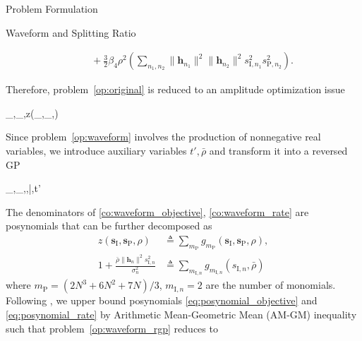 \documentclass[journal]{IEEEtran}
\begin{document}
\begin{section}{Problem Formulation}
\begin{subsection}{Waveform and Splitting Ratio}
\begin{figure*}[!b]
\begin{align}
					& \quad + \frac{3}{2}{\beta_4}{\rho^2} \left( \sum_{n_1,n_2} \lVert{\boldsymbol{h}_{n_1}}\rVert^2 \lVert{\boldsymbol{h}_{n_2}}\rVert^2 s_{\mathrm{I},{n_1}}^2 s_{\mathrm{P},{n_2}}^2 \right).\label{eq:z_waveform}
				\end{align}
			\end{figure*}%
			Therefore, problem~\eqref{op:original} is reduced to an amplitude optimization issue
			\begin{maxi!}
				{_{},_,\rho}{z(_{},_,\rho)}{\label{op:waveform}}{}
			\end{maxi!}
			Since problem~\eqref{op:waveform} involves the production of nonnegative real variables, we introduce auxiliary variables $t',\bar{\rho}$ and transform it into a reversed GP
			\begin{mini!}
				{_{},_,\rho,\bar{\rho},t'}{}{\label{op:waveform_rgp}}{}
				\label{co:waveform_power}
				\label{co:waveform_objective}
				\label{co:waveform_rate}
			\end{mini!}
			The denominators of \eqref{co:waveform_objective}, \eqref{co:waveform_rate} are posynomials \cite{Boyd2007} that can be further decomposed as
			\begin{align}
				z(\boldsymbol{s}_{\mathrm{I}},\boldsymbol{s}_\mathrm{P},\rho) &\triangleq \sum_{m_\mathrm{P}}{g_{m_\mathrm{P}}(\boldsymbol{s}_{\mathrm{I}},\boldsymbol{s}_\mathrm{P},\rho)}\label{eq:posynomial_objective},\\
				1+\frac{\bar{\rho}\lVert{\boldsymbol{h}_n}\rVert^2 s_{\mathrm{I},n}^2}{\sigma_n^2} &\triangleq \sum_{m_{\mathrm{I},n}}g_{m_{\mathrm{I},n}}(s_{\mathrm{I},n},\bar{\rho})\label{eq:posynomial_rate}
			\end{align}
			where $m_\mathrm{P}=(2N^3+6N^2+7N)/3$, $m_{\mathrm{I},n}=2$ are the number of monomials. Following \cite{Chiang2005}, we upper bound posynomials \eqref{eq:posynomial_objective} and \eqref{eq:posynomial_rate} by Arithmetic Mean-Geometric Mean (AM-GM) inequality such that problem~\eqref{op:waveform_rgp} reduces to

\end{subsection}
\end{section}
\end{document}
